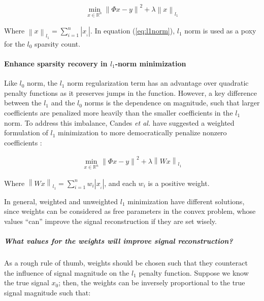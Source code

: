 \begin{equation}
\label{eq:l1norm}
\begin{gathered}
\min_{x\in \mathbb{R}^{n}}\left\|\Phi x-y\right\|^{2} + \lambda \left \|x  \right \|_{l_{1}}
\end{gathered}
\end{equation}

Where $\left \| x \right \|_{l_{1}}=\sum_{i=1}^{n}\left | x_{_{i}} \right |$. In equation (\ref{eq:l1norm}), $l_{1}$ norm is used as a poxy for the $l_{0}$ sparsity count.

\paragraph{Enhance sparsity recovery in $l_{1}$-norm minimization}
\label{section:Enhancel1NormMinimization}

Like $l_{0}$ norm, the $l_{1}$ norm regularization term has an advantage over quadratic penalty functions as it preserves jumps in the function. However, a key difference between the $l_{1}$ and the $l_{0}$ norms is the dependence on magnitude, such that larger coefficients are penalized more heavily than the smaller coefficients in the $l_{1}$ norm. To address this imbalance, Candes \emph{et al.} have suggested a weighted formulation of $l_{1}$ minimization to more democratically penalize nonzero coefficients \cite{candes2008enhancing}:

\begin{equation}
\label{eq:weightedl1norm}
\begin{gathered}
\min_{x\in \mathbb{R}^{n}}\left\|\Phi x-y\right\|^{2} + \lambda \left \|Wx  \right \|_{l_{1}}
\end{gathered}
\end{equation}

Where $\left \| Wx \right \|_{l_{1}}=\sum_{i=1}^{n}w_{i}\left | x_{_{i}} \right |$, and each $w_{i}$ is a positive weight.

In general, weighted and unweighted $l_{1}$ minimization have different solutions, since weights can be considered as free parameters in the convex problem, whose values ``can'' improve the signal reconstruction if they are set wisely.

\subparagraph*{What values for the weights will improve signal reconstruction?}
As a rough rule of thumb, weights should be chosen such that they counteract the influence of signal magnitude on the $l_{1}$ penalty function. Suppose we know the true signal $x_{0}$; then, the weights can be inversely proportional to the true signal magnitude such that:

